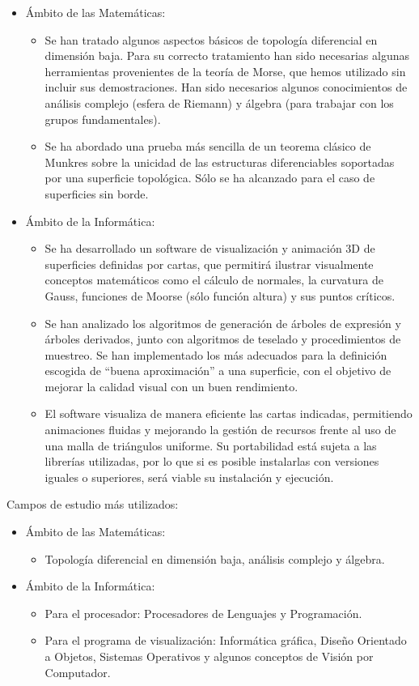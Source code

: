 \begin{itemize}
	\item Ámbito de las Matemáticas:
	\begin{itemize}
		\item Se han tratado algunos aspectos básicos de topología diferencial en dimensión baja. Para su correcto tratamiento han sido necesarias algunas herramientas provenientes de la teoría de Morse, que hemos utilizado sin incluir sus demostraciones. Han sido necesarios algunos conocimientos de análisis complejo (esfera de Riemann) y álgebra (para trabajar con los grupos fundamentales).
		\item Se ha abordado una prueba más sencilla de un teorema clásico de Munkres sobre la unicidad de las estructuras diferenciables soportadas por una superficie topológica. Sólo se ha alcanzado para el caso de superficies sin borde.
	\end{itemize}
	\item Ámbito de la Informática:
	\begin{itemize}
		\item Se ha desarrollado un software de visualización y animación $3$D de superficies definidas por cartas, que permitirá ilustrar visualmente conceptos matemáticos como el cálculo de normales, la curvatura de Gauss, funciones de Moorse (sólo función altura) y sus puntos críticos.
		\item Se han analizado los algoritmos de generación de árboles de expresión y árboles derivados, junto con algoritmos de teselado y procedimientos de muestreo. Se han implementado los más adecuados para la definición escogida de ``buena aproximación'' a una superficie, con el objetivo de mejorar la calidad visual con un buen rendimiento.
		\item El software visualiza de manera eficiente las cartas indicadas, permitiendo animaciones fluidas y mejorando la gestión de recursos frente al uso de una malla de triángulos uniforme. Su portabilidad está sujeta a las librerías utilizadas, por lo que si es posible instalarlas con versiones iguales o superiores, será viable su instalación y ejecución.
	\end{itemize}
\end{itemize}
Campos de estudio más utilizados:
\begin{itemize}
	\item Ámbito de las Matemáticas:
	\begin{itemize}
		\item Topología diferencial en dimensión baja, análisis complejo y álgebra.
	\end{itemize}
	\item Ámbito de la Informática:
	\begin{itemize}
		\item Para el procesador: Procesadores de Lenguajes y Programación.
		\item Para el programa de visualización: Informática gráfica, Diseño Orientado a Objetos, Sistemas Operativos y algunos conceptos de Visión por Computador.
	\end{itemize}
\end{itemize}

\endinput
